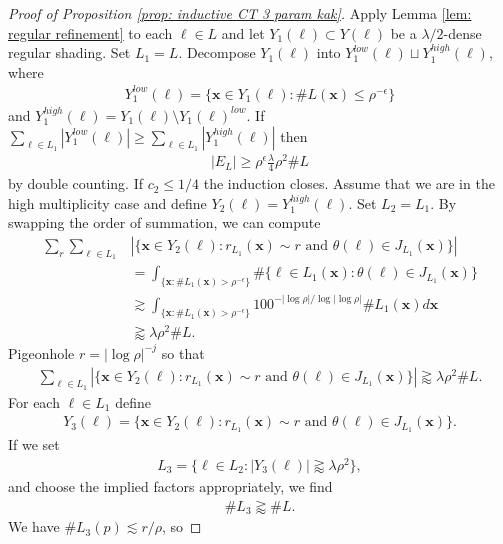\documentclass[12pt]{amsart}
\newcommand{\x}{{\bf{x}}}
\numberwithin{equation}{section}
\newcommand{\1}{\mathbbm{1}}
\renewcommand{\x}{\mathbf x}
\begin{document}
\begin{proof}[Proof of Proposition \ref{prop: inductive CT 3 param kak}]
    Apply Lemma \ref{lem: regular refinement} to each $\ell \in L$ and let $Y_1(\ell) \subset Y(\ell)$ be a $\lambda/ 2$-dense regular shading. Set $L_1 = L$. Decompose $Y_1(\ell)$ into $Y_1^{low}(\ell) \sqcup Y_1^{high}(\ell)$, where 
    \begin{align}
        Y_1^{low}(\ell) = \{\x \in Y_1(\ell) : \# L(\x) \leq \rho^{-\epsilon} \}
    \end{align}
    and $Y_1^{high}(\ell) = Y_1(\ell) \setminus Y_1(\ell)^{low}$. If $\sum_{\ell \in L_1} |Y_1^{low}(\ell)| \geq \sum_{\ell \in L_1} |Y_1^{high}(\ell)|$ then 
    \begin{align}
        |E_L| \geq \rho^\epsilon \frac{\lambda}{4} \rho^2 \# L
    \end{align}
    by double counting. If $c_2 \leq 1/4$ the induction closes. Assume that we are in the high multiplicity case and define $Y_2(\ell) = Y_1^{high}(\ell)$. Set $L_2 = L_1$. By swapping the order of summation, we can compute
    \begin{align}
        \sum_r \sum_{\ell \in L_1}& |\{\x \in Y_2(\ell) : r_{L_1}(\x) \sim r \text{ and } \theta(\ell) \in J_{L_1}(\x)\}| 
        \\ &= \int_{\{\x : \#L_1(\x) > \rho^{-\epsilon}\}} \# \{\ell \in L_1(\x) : \theta(\ell) \in J_{L_1}(\x)\} \\
        &\gtrsim \int_{\{\x : \# L_1(\x) > \rho^{-\epsilon}\}} 100^{-|\log \rho| / \log |\log \rho|} \# L_1(\x) d\x \\
        &\gtrapprox \lambda \rho^2 \# L. 
    \end{align}
    Pigeonhole $r = |\log \rho|^{-j}$ so that 
    \begin{align}
        \sum_{\ell \in L_1} |\{\x \in Y_2(\ell) : r_{L_1}(\x) \sim r \text{ and } \theta(\ell) \in J_{L_1}(\x)\}| \gtrapprox \lambda \rho^2 \# L.
    \end{align}
    For each $\ell \in L_1$ define 
    \begin{align}
        Y_3(\ell) = \{\x \in Y_2(\ell) : r_{L_1}(\x) \sim r \text{ and } \theta(\ell) \in J_{L_1}(\x) \}.
    \end{align}
    If we set 
    \begin{align}
        L_3 = \{\ell \in L_2 : |Y_3(\ell)| \gtrapprox \lambda \rho^2\},
    \end{align}
    and choose the implied factors appropriately, we find 
    \begin{align}
        \# L_3 \gtrapprox \# L. 
    \end{align}
    We have $\# L_3(p) \lesssim r/\rho$, so 

\end{proof}
\end{document}
